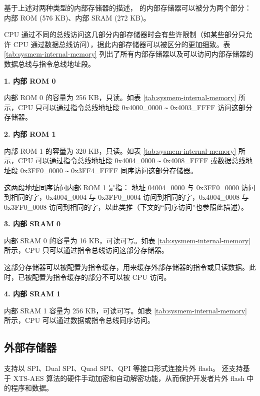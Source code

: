 \documentclass[main\_\_CN.tex]{subfiles}
\begin{document}
基于上述对两种类型的内部存储器的描述，\chipname{} 的内部存储器可以被分为两个部分：内部 ROM (576 KB)、内部 SRAM (272 KB)。


CPU 通过不同的总线访问这几部分内部存储器时会有些许限制（如某些部分只允许 CPU 通过数据总线访问），据此内部存储器可以被区分的更加细致。表 \ref{tab:sysmem-internal-memory}  列出了所有内部存储器以及可以访问内部存储器的数据总线与指令总线地址段。



{\bfseries 1. 内部 ROM 0}

内部 ROM 0 的容量为 256 KB，只读。如表 \ref{tab:sysmem-internal-memory} 所示，CPU 只可以通过指令总线地址段 0x4000\_0000 \verb+~+ 0x4003\_FFFF 访问这部分存储器。

{\bfseries 2. 内部 ROM 1}

内部 ROM 1 的容量为 320 KB，只读。如表 \ref{tab:sysmem-internal-memory} 所示，CPU 可以通过指令总线地址段 0x4004\_0000 \verb+~+ 0x4008\_FFFF 或数据总线地址段 0x3FF0\_0000 \verb+~+ 0x3FF4\_FFFF 同序访问这部分存储器。

这两段地址同序访问内部 ROM 1 是指： 地址 04004\_0000 与 0x3FF0\_0000 访问到相同的字，0x4004\_0004 与 0x3FF0\_0004 访问到相同的字，0x4004\_0008 与 0x3FF0\_0008 访问到相同的字，以此类推（下文的“同序访问”也参照此描述）。

{\bfseries 3. 内部 SRAM 0}
\label{other:sysmem-internal-sram-0}

内部 SRAM 0 的容量为 16 KB，可读可写。如表 \ref{tab:sysmem-internal-memory} 所示，CPU 只可以通过指令总线访问这部分存储器。

这部分存储器可以被配置为指令缓存，用来缓存外部存储器的指令或只读数据。此时，已被配置为指令缓存的部分不可以被 CPU 访问。



{\bfseries 4. 内部 SRAM 1}

内部 SRAM 1 容量为 256 KB，可读可写。如表 \ref{tab:sysmem-internal-memory} 所示，CPU 可以通过数据或指令总线同序访问。




\subsection{外部存储器}
\label{para:sysmem-external-memory}

\chipname{} 支持以 SPI、Dual SPI、Quad SPI、QPI 等接口形式连接片外 flash。
\chipname{} 还支持基于 XTS-AES 算法的硬件手动加密和自动解密功能，从而保护开发者片外 flash 中的程序和数据。
\end{document}
